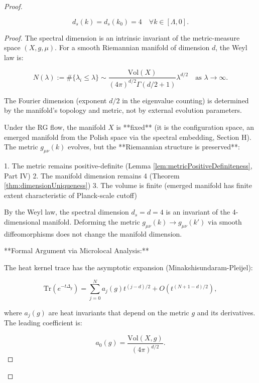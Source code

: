 \begin{proof}
\begin{lemma}
\begin{equation}
d_s(k) = d_s(k_0) = 4 \quad \forall k \in [\Lambda, 0].
\end{equation}

\begin{proof}

The spectral dimension is an intrinsic invariant of the metric-measure space $(X, g, \mu)$. For a smooth Riemannian manifold of dimension $d$, the Weyl law is:

\begin{equation}
N(\lambda) := \#\{\lambda_i \leq \lambda\} \sim \frac{\mathrm{Vol}(X)}{(4\pi)^{d/2} \Gamma(d/2+1)} \lambda^{d/2} \quad \text{as } \lambda \to \infty.
\end{equation}

The Fourier dimension (exponent $d/2$ in the eigenvalue counting) is determined by the manifold's topology and metric, not by external evolution parameters.

Under the RG flow, the manifold $X$ is **fixed** (it is the configuration space, an emerged manifold from the Polish space via the spectral embedding, Section H). The metric $g_{\mu\nu}(k)$ evolves, but the **Riemannian structure is preserved**:

1. The metric remains positive-definite (Lemma \ref{lem:metricPositiveDefiniteness}, Part IV)
2. The manifold dimension remains 4 (Theorem \ref{thm:dimensionUniqueness})
3. The volume is finite (emerged manifold has finite extent characteristic of Planck-scale cutoff)

By the Weyl law, the spectral dimension $d_s = d = 4$ is an invariant of the 4-dimensional manifold. Deforming the metric $g_{\mu\nu}(k) \to g_{\mu\nu}(k')$ via smooth diffeomorphisms does not change the manifold dimension.

**Formal Argument via Microlocal Analysis:**

The heat kernel trace has the asymptotic expansion (Minakshisundaram-Pleijel):

\begin{equation}
\mathrm{Tr}(e^{-t\Delta_g}) = \sum_{j=0}^N a_j(g) t^{(j-d)/2} + O(t^{(N+1-d)/2}),
\end{equation}

where $a_j(g)$ are heat invariants that depend on the metric $g$ and its derivatives. The leading coefficient is:

\begin{equation}
a_0(g) = \frac{\mathrm{Vol}(X, g)}{(4\pi)^{d/2}}.
\end{equation}


\end{proof}
\end{lemma}
\end{proof}
